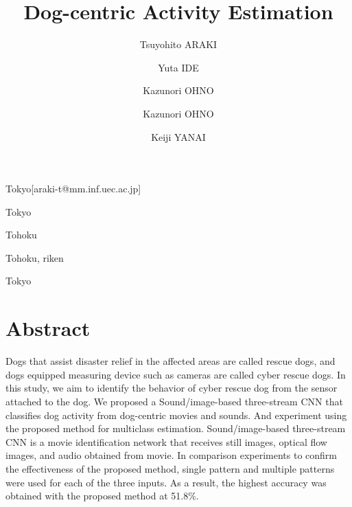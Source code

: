 \documentclass[MIRU,submit,english]{miru2019e}
\begin{document}
\title{Dog-centric Activity Estimation}


 \author{Tsuyohito ARAKI}{Tokyo}[araki-t@mm.inf.uec.ac.jp]
 \author{Yuta IDE}{Tokyo}%
 \author{Kazunori OHNO}{Tohoku}%
 \author{Kazunori OHNO}{Tohoku, riken}%
 \author{Keiji YANAI}{Tokyo}%

\maketitle
\section*{Abstract}
Dogs that assist disaster relief in the affected areas are called rescue dogs, and dogs equipped measuring device such as cameras are called cyber rescue dogs.
In this study, we aim to identify the behavior of cyber rescue dog from the sensor attached to the dog.
We proposed a Sound/image-based three-stream CNN that classifies dog activity from dog-centric movies and sounds.
And experiment using the proposed method for multiclass estimation.
Sound/image-based three-stream CNN is a movie identification network that receives still images, optical flow images, and audio obtained from movie.
In comparison experiments to confirm the effectiveness of the proposed method, single pattern and multiple patterns were used for each of the three inputs.
As a result, the highest accuracy was obtained with the proposed method at 51.8\%.
\end{document}
